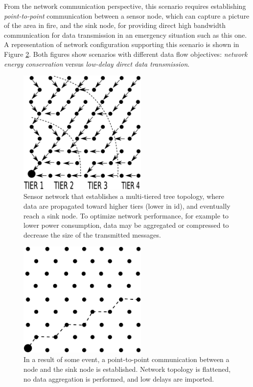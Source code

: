 \documentclass[11pt]{article}
\begin{document}
From the network communication perspective, this scenario requires
establishing \textit{point-to-point} communication between a sensor node,
which can capture a picture of the area in fire, and the sink node, for 
providing direct high bandwidth communication for data transmission in an
emergency situation such as this one. A representation of network
configuration supporting this scenario is shown in Figure
\ref{fig:scenariob}. Both figures show scenarios with different data flow
objectives: \textit{network energy conservation} versus \textit{low-delay
direct data transmission}. 

\begin{figure}
\centering
	\includegraphics[width=2.5in]{fig/scenario_2a}
	\caption{Sensor network that establishes a multi-tiered tree
	topology, where data are propagated toward higher tiers (lower in
	id), and eventually reach a sink node. To optimize network
	performance, for example to lower power consumption, data may be
	aggregated or compressed to decrease the size of the transmitted
	messages.}
	\label{fig:scenarioa}
\end{figure}

\begin{figure}
\centering
	\includegraphics[width=2.5in]{fig/scenario_2b}
	\caption{In a result of some event, a point-to-point communication 
	between a node and the sink node is established. Network topology
	is flattened, no data aggregation is performed, and low delays are
	imported.}
	\label{fig:scenariob}
\end{figure}
\end{document}

